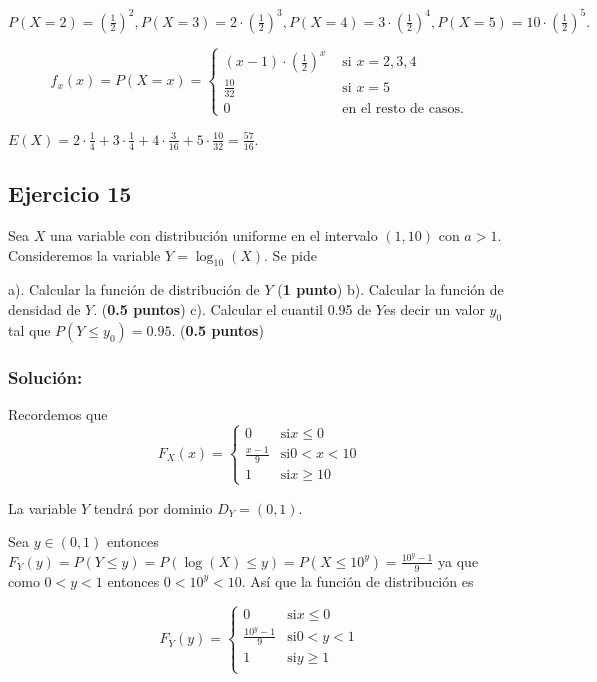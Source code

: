 \documentclass[]{article}
\begin{document}
\(P(X=2)=\left(\frac{1}{2}\right)^2, P(X=3)=2\cdot\left(\frac{1}{2}\right)^3,P(X=4)=3\cdot\left(\frac{1}{2}\right)^4,P(X=5)=10\cdot \left(\frac{1}{2}\right)^5.\)

\[f_x(x)=P(X=x)= \left\{\begin{array}{ll} 
(x-1)\cdot \left(\frac{1}{2}\right)^x & \mbox{ si } x=2,3,4\\
\frac{10}{32}& \mbox{ si } x=5\\
0 & \mbox{ en el resto de casos.}
\end{array}
\right.
\]

\(E(X)=2\cdot\frac{1}{4}+3\cdot \frac{1}{4}+ 4\cdot \frac{3}{16}+5\cdot \frac{10}{32}=\frac{57}{16}.\)

\hypertarget{ejercicio-15}{%
\subsection{Ejercicio 15}\label{ejercicio-15}}

Sea \(X\) una variable con distribución uniforme en el intervalo
\((1,10)\) con \(a>1\). Consideremos la variable \(Y=\log_{10}(X)\). Se
pide

a). Calcular la función de distribución de \(Y\) (\textbf{1 punto}) b).
Calcular la función de densidad de \(Y\). (\textbf{0.5 puntos}) c).
Calcular el cuantil 0.95 de \(Y\)es decir un valor \(y_0\) tal que
\(P(Y\leq y_0)=0.95\). (\textbf{0.5 puntos})

\hypertarget{soluciuxf3n-14}{%
\subsubsection{Solución:}\label{soluciuxf3n-14}}

Recordemos que \[
F_X(x)=\left\{
\begin{array}{ll} 
0 & \mbox{si} x\leq 0\\
\frac{x-1}{9} & \mbox{si} 0< x < 10\\
1 & \mbox{si} x\geq 10
\end{array}\right.
\]

La variable \(Y\) tendrá por dominio \(D_Y=(0,1)\).

Sea \(y\in(0,1)\) entonces
\(F_Y(y)=P(Y\leq y)=P(\log(X)\leq y)=P(X\leq 10^y)=\frac{10^y-1}{9}\) ya
que como \(0<y<1\) entonces \(0< 10^y < 10\). Así que la función de
distribución es

\[
F_Y(y)=\left\{\begin{array}{ll} 
0 & \mbox{si} x\leq 0\\
\frac{10^y-1}{9} & \mbox{si} 0< y < 1\\
1 & \mbox{si} y\geq 1\\
\end{array}\right.
\]
\end{document}
